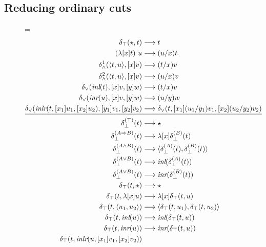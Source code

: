 \documentclass[screen, sigconf,authorversion,nonacm]{acmart}
\theoremstyle{acmdefinition}
\numberwithin{equation}{section}
\newcommand\abstr[1]{[#1]}
\newcommand\inl{\mbox{\it inl}}
\newcommand\inr{\mbox{\it inr}}
\newcommand\inlr{\mbox{\it inlr}}
\newcommand\elimtop{\delta_{\top}}
\newcommand\elimbot[1]{\delta^{(#1)}_{\bot}}
\newcommand\elimand{\delta_{\wedge}}
\newcommand\elimor{\delta_{\vee}}
\newcommand\pair[2]{\langle #1, #2 \rangle}
\newcommand\lra{\longrightarrow}
\begin{document}
\subsection{Reducing ordinary cuts}
\begin{figure*}[!ht]
  \centering
  \columnwidth=\linewidth
  \begin{align}
    \elimtop(\star, t) & \longrightarrow t \label{nnnruelimtop}\\
    (\lambda \abstr{x}t)~u & \longrightarrow  (u/x)t \label{nnnrubeta}\\
    \elimand^1(\pair{t}{u}, \abstr{x}v) & \longrightarrow  (t/x)v \label{nnnruelimand1}\\
    \elimand^2(\pair{t}{u}, \abstr{x}v) & \longrightarrow  (u/x)v \label{nnnruelimand2}\\
    \elimor(\inl(t),\abstr{x}v,\abstr{y}w) & \longrightarrow  (t/x)v 
    \label{nnnruelimorinl}\\
    \elimor(\inr(u),\abstr{x}v,\abstr{y}w) & \longrightarrow  (u/y)w
    \label{nnnruelimorinr}\\
\elimor(\inlr(t,\abstr{x_1} u_1,\abstr{x_2} u_2),
\abstr{y_1} v_1, \abstr{y_2} v_2)
&\lra \elimor(t,\abstr{x_1}(u_1/y_1)v_1,\abstr{x_2}(u_2/y_2)v_2)
\label{nnnruelimorinlr}\\[1pt]\hline\nonumber\\[-11pt]
    \elimbot{\top}(t) &\lra \star \label{nnnruleelimbotstar} \\
    \elimbot{A\Rightarrow B}(t) &\lra\lambda \abstr{x}\elimbot{B}(t) \label{nnnruleelimbotlambda}\\
    \elimbot{A\wedge B}(t) &\lra\pair{\elimbot{A}(t)}{\elimbot{B}(t)} \label{nnnruleelimbotpair}\\
    \elimbot{A\vee B}(t) &\lra \inl(\elimbot{A}(t)) \label{nnnruleelimbotinl}\\
    \elimbot{A\vee B}(t) &\lra \inr(\elimbot{B}(t)) \label{nnnruleelimbotinr}\\
    \elimtop(t, \star) &\lra \star\label{nnnruleelimtopstar}\\
    \elimtop(t, \lambda \abstr{x} u) &\lra \lambda \abstr{x} \elimtop(t, u)\\
    \elimtop(t, \pair{u_1}{u_2}) &\lra\pair{\elimtop(t, u_1)}{\elimtop(t,u_2)}\\
    \elimtop(t, \inl(u)) &\lra \inl(\elimtop(t,u))\\
    \elimtop(t, \inr(u)) &\lra \inr(\elimtop(t,u))\\
    \elimtop(t, \inlr(u,\abstr{x_1} v_1,
    \abstr{x_2} v_2))

\end{align}
\end{figure*}
\end{document}

